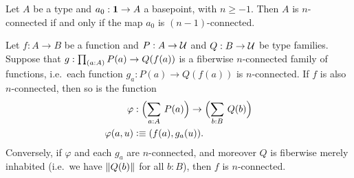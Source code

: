 \documentclass[hott-all.tex]{subfiles}
\begin{document}
% 
% 
\begin{lem}
  Let $A$ be a type and $a_0:\mathbf{1}\to A$ a basepoint, with $n\ge -1$.
  Then $A$ is $n$-connected if and only if the map $a_0$ is $(n-1)$-connected.
\end{lem}
% 
% 
% 
% 
\begin{lem}
Let $f:A\to B$ be a function and $P:A\to\mathcal{U}$ and $Q:B\to\mathcal{U}$ be type families. Suppose that $g:\prd{a:A} P(a)\to Q(f(a))$
is a fiberwise $n$-connected%
family of functions, i.e.\ each function $g_a : P(a) \to Q(f(a))$ is $n$-connected.
If $f$ is also $n$-connected, then so is the function
\begin{align*}
\varphi &:\Parens{\sm{a:A} P(a)}\to\Parens{\sm{b:B} Q(b)}\\
\varphi(a,u) &\defeq \pairr{f(a),g_a(u)}.
\end{align*}
Conversely, if $\varphi$ and each $g_a$ are $n$-connected, and moreover $Q$ is fiberwise merely inhabited (i.e.\ we have $\mathopen{}\left\Vert Q(b)\right\Vert_{}\mathclose{}$ for all $b:B$), then $f$ is $n$-connected.
\end{lem}
\end{document}
